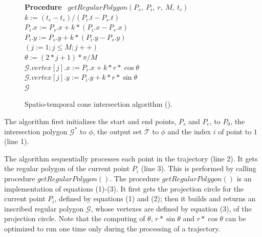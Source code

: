 \begin{figure}[tb!]
\begin{center}
{\begin{minipage}{3.36in}
{	{\bf Procedure} ~$getRegularPolygon(P_s,~P_i,~r,~M,~t_c)$ \\
	\bcc \hspace{1ex} $k := (t_c-t_s)/(P_i.t - P_s.t)$ \\
	\icc \hspace{1ex} $P_i.x := P_s.x + k*(P_i.x-P_s.x)$ \\
	\icc \hspace{1ex} $P_i.y := P_s.y + k*(P_i.y-P_s.y)$ \\
	\icc \hspace{1ex} \For $(j := 1;j \le M;j++)$ \\
	\icc \> \hspace{3ex} $\theta :=  (2 * j + 1)*\pi /M $ \\
	\icc \> \hspace{3ex} $\mathcal{G}.vertex[j].x := P_i.x + k*r*\cos\theta$\\
	\icc \> \hspace{3ex} $\mathcal{G}.vertex[j].y := P_i.y + k*r*\sin\theta$\\
	\icc \hspace{1ex} \Return $\mathcal{G}$
}
\vspace{-2ex}
\myhrule
\end{minipage}
}
\end{center}
\vspace{-2ex}
\caption{\small Spatio-temporal cone intersection algorithm (\cist).}
\label{alg:CI3d}
\vspace{-2ex}
\end{figure}




The algorithm first initializes the start and end points, $P_s$ and $P_e$, to $P_0$, the intersection polygon $\mathcal{G}^*$ to $\phi$, the output set $\overline{\mathcal{T}}$ to $\phi$ and the index $i$ of point to $1$ (line 1).

The algorithm sequentially processes each point in the trajectory (line 2).
It gets the regular polygon of the current point $P_i$ (line 3).
This is performed by calling procedure $getRegularPolygon()$. The procedure $getRegularPolygon()$ is an implementation of equations (1)-(3). It first gets the projection circle for the current point $P_i$, defined by equations (1) and (2); then it builds and returns an inscribed regular polygon $\mathcal{G}$, whose vertexes are defined by equation (3), of the projection circle.
Note that the computing of $\theta$, $r*\sin\theta$ and $r*\cos\theta$ can be optimized to run one time only during the processing of a trajectory.

